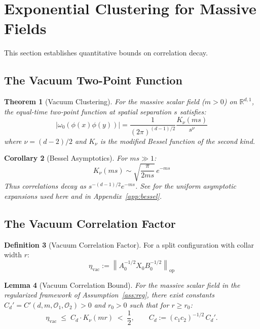 \documentclass[11pt,a4paper]{article}
\theoremstyle{plain}
\newtheorem{theorem}{Theorem}[section]
\newtheorem{lemma}[theorem]{Lemma}
\newtheorem{corollary}[theorem]{Corollary}
\theoremstyle{definition}
\newtheorem{definition}[theorem]{Definition}
\theoremstyle{remark}
\newcommand{\Oo}{\mathcal{O}}
\newcommand{\R}{\mathbb{R}}
\newcommand{\opnorm}[1]{\left\lVert #1 \right\rVert_{\mathrm{op}}}
\newcommand{\etavac}{\eta_{\mathrm{vac}}}
\begin{document}
\section{Exponential Clustering for Massive Fields}\label{sec:clustering}

This section establishes quantitative bounds on correlation decay.

\subsection{The Vacuum Two-Point Function}

\begin{theorem}[Vacuum Clustering]\label{thm:clustering}
For the massive scalar field ($m > 0$) on $\R^{d,1}$, the equal-time two-point
function at spatial separation $s$ satisfies:
\begin{equation}\label{eq:twopoint}
|\omega_0(\phi(x)\phi(y))| = \frac{1}{(2\pi)^{(d-1)/2}} \frac{K_\nu(ms)}{s^{\nu}}
\end{equation}
where $\nu = (d-2)/2$ and $K_\nu$ is the modified Bessel function of the second kind.
\end{theorem}

\begin{corollary}[Bessel Asymptotics]\label{cor:bessel}
For $ms \gg 1$:
\begin{equation}
K_\nu(ms) \sim \sqrt{\frac{\pi}{2ms}}\, e^{-ms}
\end{equation}
Thus correlations decay as $s^{-(d-1)/2} e^{-ms}$. See
\cite[\S10.40]{NIST} for the uniform asymptotic expansions used here and in
Appendix~\ref{app:bessel}.
\end{corollary}

\subsection{The Vacuum Correlation Factor}

\begin{definition}[Vacuum Correlation Factor]
For a split configuration with collar width $r$:
\begin{equation}
\etavac := \opnorm{A_0^{-1/2} X_0 B_0^{-1/2}}
\end{equation}
\end{definition}

\begin{lemma}[Vacuum Correlation Bound]\label{lem:vacbound}
For the massive scalar field in the regularized framework of
Assumption~\ref{ass:reg}, there exist constants $C_d' = C'(d, m, \Oo_1, \Oo_2) > 0$
and $r_0 > 0$ such that for $r \ge r_0$:
\begin{equation}
\etavac \;\le\; C_d \cdot K_\nu(mr) \;<\; \frac{1}{2},
\qquad C_d := (c_1 c_2)^{-1/2}\, C_d'.
\end{equation}
\end{lemma}
\end{document}
